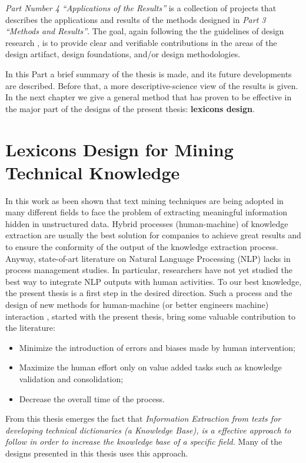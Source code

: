 \documentclass[]{book}
\theoremstyle{definition}
\theoremstyle{definition}
\theoremstyle{definition}
\theoremstyle{remark}
\begin{document}
\emph{Part Number 4 ``Applications of the Results''} is a collection of
projects that describes the applications and results of the methods
designed in \emph{Part 3 ``Methods and Results''}. The goal, again
following the the guidelines of design research
\citep{bichler2006design}, is to provide clear and verifiable
contributions in the areas of the design artifact, design foundations,
and/or design methodologies.

In this Part a brief summary of the thesis is made, and its future
developments are described. Before that, a more descriptive-science view
of the results is given. In the next chapter we give a general method
that has proven to be effective in the major part of the designs of the
present thesis: \textbf{lexicons design}.

\chapter{Lexicons Design for Mining Technical
Knowledge}\label{sotadocumentsunderstandlexicons}

In this work as been shown that text mining techniques are being adopted
in many different fields to face the problem of extracting meaningful
information hidden in unstructured data. Hybrid processes
(human-machine) of knowledge extraction are usually the best solution
for companies to achieve great results and to ensure the conformity of
the output of the knowledge extraction process. Anyway, state-of-art
literature on Natural Language Processing (NLP) lacks in process
management studies. In particular, researchers have not yet studied the
best way to integrate NLP outputs with human activities. To our best
knowledge, the present thesis is a first step in the desired direction.
Such a process and the design of new methods for human-machine (or
better engineers machine) interaction , started with the present thesis,
bring some valuable contribution to the literature:

\begin{itemize}
\item
  Minimize the introduction of errors and biases made by human
  intervention;
\item
  Maximize the human effort only on value added tasks such as knowledge
  validation and consolidation;
\item
  Decrease the overall time of the process.
\end{itemize}

From this thesis emerges the fact that \emph{Information Extraction from
texts for developing technical dictionaries (a Knowledge Base), is a
effective approach to follow in order to increase the knowledge base of
a specific field.} Many of the designs presented in this thesis uses
this approach.
\end{document}
